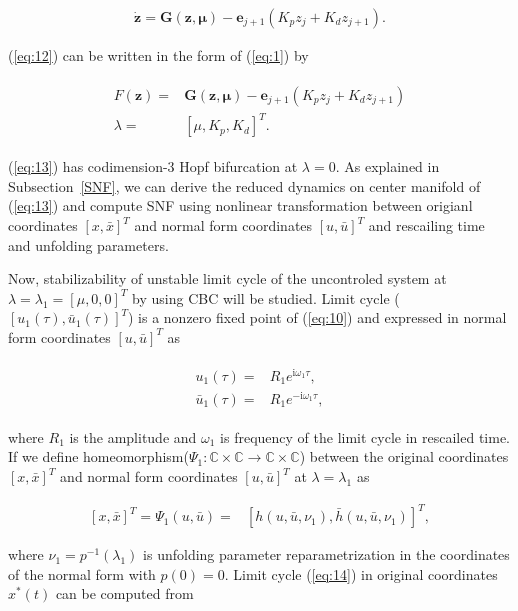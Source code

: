 \documentclass[openacc]{rsproca_new}%
\def\complex{\mathbb{C}}
\def\vec#1{\ensuremath{\mathbf{#1}}}
\newcommand{\Eref}[1]{(\ref{#1})}
\newcommand{\Ssref}[1]{Subsection~\ref{#1}}
\begin{document}
\begin{align}\label{eq:12}
    \dot{\vec{z}} =\vec{G}(\vec{z},\vec{\mu})-\vec{e}_{j+1}(K_p z_j+K_d z_{j+1}).
\end{align}

\noindent \Eref{eq:12} can be written in the form of \Eref{eq:1} by

\begin{align}\label{eq:13}
\begin{split}
  F({\vec{z}})=&\vec{G}(\vec{z},\vec{\mu})-\vec{e}_{j+1}(K_pz_j+K_d z_{j+1})\\
  \lambda=&[\mu,K_p,K_d]^T.
\end{split}
\end{align}

\noindent \Eref{eq:13} has codimension-3 Hopf bifurcation at $\lambda=0$. As explained in \Ssref{SNF}, we can derive the reduced dynamics on center manifold of \Eref{eq:13} and compute SNF using nonlinear transformation between origianl coordinates $[x,\bar x]^T$ and normal form coordinates $[u,\bar u]^T$ and rescailing time and unfolding parameters.

Now, stabilizability of unstable limit cycle of the uncontroled system at $\lambda=\lambda_1=[\mu,0,0]^T$ by using CBC will be studied. Limit cycle ($[u_1(\tau),\bar u_1(\tau)]^T$) is a nonzero fixed point of \Eref{eq:10} and expressed in normal form coordinates $[u,\bar u]^T$ as

\begin{align}\label{eq:14}
  \begin{split}
      u_1(\tau)=&R_1e^{\textrm{i}\omega_1 \tau},\\
      \bar u_1(\tau)=&R_1e^{-\textrm{i}\omega_1 \tau},
    \end{split}
\end{align}

\noindent where $R_1$ is the amplitude and $\omega_1$ is frequency of the limit cycle in rescailed time. If we define homeomorphism($\Psi_1:\complex\times\complex\rightarrow\complex\times\complex$) between the original coordinates $[x,\bar x]^T$ and normal form coordinates $[u,\bar u]^T$ at $\lambda=\lambda_1$ as

\begin{align}\label{eq:15}
    [x,\bar x]^T=\Psi_1(u,\bar u)=&[h(u,\bar u,\nu_1),\bar h(u,\bar u,\nu_1)]^T,
\end{align}

\noindent  where $\nu_1=p^{-1}(\lambda_1)$ is unfolding parameter reparametrization in the coordinates of the normal form with $p(0)=0$. Limit cycle \Eref{eq:14} in original coordinates $x^*(t)$ can be computed from
\end{document}
